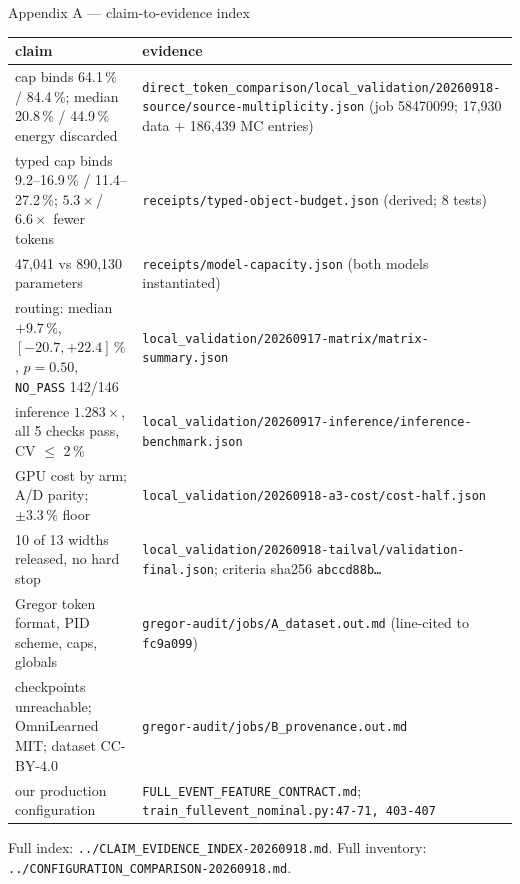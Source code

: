 \documentclass[aspectratio=169,10pt]{beamer}
\begin{document}
\begin{frame}{Appendix A --- claim-to-evidence index}
  \begin{center}\scriptsize
  \begin{tabular}{@{}R{0.40\textwidth}R{0.55\textwidth}@{}}
    \toprule
    \textbf{claim} & \textbf{evidence} \\
    \midrule
    cap binds 64.1\,\% / 84.4\,\%; median 20.8\,\% / 44.9\,\% energy discarded &
      \texttt{direct\_token\_comparison/local\_validation/20260918-source/\allowbreak source-multiplicity.json}
      (job 58470099; 17{,}930 data + 186{,}439 MC entries) \\
    typed cap binds 9.2--16.9\,\% / 11.4--27.2\,\%; $5.3\times$/$6.6\times$ fewer tokens &
      \texttt{receipts/typed-object-budget.json} (derived; 8 tests) \\
    47{,}041 vs 890{,}130 parameters &
      \texttt{receipts/model-capacity.json} (both models instantiated) \\
    routing: median $+9.7\,\%$, $[-20.7,+22.4]\,\%$, $p=0.50$, \texttt{NO\_PASS} 142/146 &
      \texttt{local\_validation/20260917-matrix/matrix-summary.json} \\
    inference $1.283\times$, all 5 checks pass, CV $\le$ 2\,\% &
      \texttt{local\_validation/20260917-inference/inference-benchmark.json} \\
    GPU cost by arm; A/D parity; $\pm3.3\,\%$ floor &
      \texttt{local\_validation/20260918-a3-cost/cost-half.json} \\
    10 of 13 widths released, no hard stop &
      \texttt{local\_validation/20260918-tailval/validation-final.json};
      criteria sha256 \texttt{abccd88b\ldots} \\
    Gregor token format, PID scheme, caps, globals &
      \texttt{gregor-audit/jobs/A\_dataset.out.md} (line-cited to \texttt{fc9a099}) \\
    checkpoints unreachable; OmniLearned MIT; dataset CC-BY-4.0 &
      \texttt{gregor-audit/jobs/B\_provenance.out.md} \\
    our production configuration &
      \texttt{FULL\_EVENT\_FEATURE\_CONTRACT.md};
      \texttt{train\_fullevent\_\allowbreak nominal.py:47-71, 403-407} \\
    \bottomrule
  \end{tabular}
  \end{center}
  {\scriptsize Full index: \texttt{../CLAIM\_EVIDENCE\_INDEX-20260918.md}. Full
  inventory: \texttt{../CONFIGURATION\_COMPARISON-20260918.md}.}
\end{frame}
\end{document}

